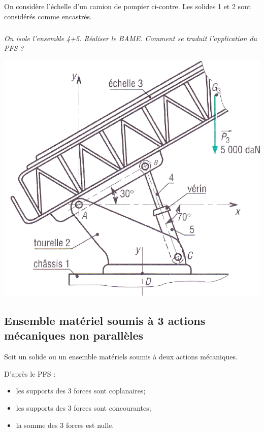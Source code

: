\documentclass[10pt]{article}
\begin{document}
\begin{minipage}[c]{.6\linewidth}
On considère l'échelle d'un camion de pompier ci-contre. Les solides 1 et 2 sont considérés comme encastrés. 

\subparagraph{}
\textit{On isole l'ensemble 4+5. Réaliser le BAME. Comment se traduit l'application du PFS ?}

\end{minipage} \hfill
\begin{minipage}[c]{.37\linewidth}
\begin{center}
\includegraphics[width=.95\textwidth]{images/echelle}
\end{center}
\end{minipage} 

\subsection*{Ensemble matériel soumis à 3 actions mécaniques non parallèles}

\begin{resultat}
Soit un solide ou un ensemble matériels soumis à deux actions mécaniques. 

D'après le PFS :
\begin{itemize}
\item les supports des 3 forces sont coplanaires;
\item les supports des 3 forces sont concourantes;
\item la somme des 3 forces est nulle.
\end{itemize}

\end{resultat}
\end{document}
